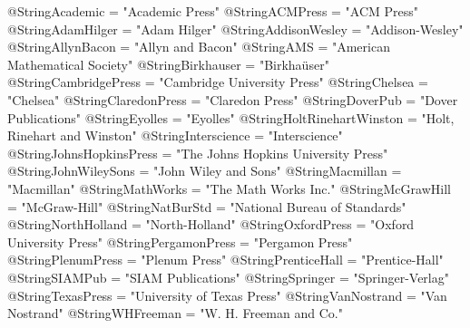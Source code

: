  @String{Academic = "Academic Press" }
 @String{ACMPress = "{ACM} Press" }
 @String{AdamHilger = "Adam Hilger" }
 @String{AddisonWesley = "Addison-Wesley" }
 @String{AllynBacon = "Allyn and Bacon" }
 @String{AMS = "American Mathematical Society" }
 @String{Birkhauser = "Birkha{\"u}ser" }
 @String{CambridgePress = "Cambridge University Press" }
 @String{Chelsea = "Chelsea" }
 @String{ClaredonPress = "Claredon Press" }
 @String{DoverPub = "Dover Publications" }
 @String{Eyolles = "Eyolles" }
 @String{HoltRinehartWinston = "Holt, Rinehart and Winston" }
 @String{Interscience = "Interscience" }
 @String{JohnsHopkinsPress = "The Johns Hopkins University Press" }
 @String{JohnWileySons = "John Wiley and Sons" }
 @String{Macmillan = "Macmillan" }
 @String{MathWorks = "The Math Works Inc." }
 @String{McGrawHill = "McGraw-Hill" }
 @String{NatBurStd = "National Bureau of Standards" }
 @String{NorthHolland = "North-Holland" }
 @String{OxfordPress = "Oxford University Press" }  %
 @String{PergamonPress = "Pergamon Press" }
 @String{PlenumPress = "Plenum Press" }
 @String{PrenticeHall = "Prentice-Hall" }
 @String{SIAMPub = "{SIAM} Publications" }
 @String{Springer = "Springer-Verlag" }
 @String{TexasPress = "University of Texas Press" }
 @String{VanNostrand = "Van Nostrand" }
 @String{WHFreeman = "W. H. Freeman and Co." }

